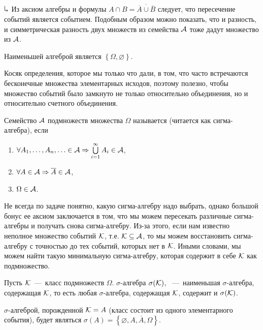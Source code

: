 \documentclass[../TV&MS.tex]{subfiles}
\begin{document}
$\h$ Из аксиом алгебры и формулы $A\cap B = \overline{\overline{A} \cup \overline {B}}$ 
следует, что пересечение событий является событием. Подобным образом можно показать, 
что и разность, и симметрическая разность двух множеств из семейства $\mathcal{A}$ тоже
дадут множество из $\mathcal{A}$.

\begin{Ex}
	Наименьшей алгеброй является $\left\{ \Omega, \varnothing \right\}$.
\end{Ex}

Косяк определения, которое мы только что дали, в том, что часто встречаются бесконечные множества элементарных исходов, поэтому полезно, чтобы множество
событий было замкнуто не только относительно объединения, но и 
относительно счетного объединения.

\begin{Def}
	Семейство $\mathcal{A}$ подмножеств множества $\Omega$ называется 
	(читается как сигма-алгебра), если 
\begin{enumerate}[label=(\roman*)]
	\item $\forall A_1,\dots,A_n,\ldots\in\mathcal{A}\Rightarrow\bigcup\limits_{i=1}^{\infty}A_i\in\mathcal{A}$,
	\item $\forall A \in \mathcal{A} \Rightarrow \overline{A} \in \mathcal{A}$,
	\item $\Omega \in \mathcal{A}$.
\end{enumerate}\smallskip
\end{Def}

Не всегда по задаче понятно, какую сигма-алгебру надо выбрать, однако большой
бонус ее аксиом заключается в том, что мы можем пересекать различные сигма-алгебры
и получать снова сигма-алгебру. Из-за этого, если нам известно неполное множество
событий $\mathcal{K}$, т.е. $\mathcal{K}\subseteq\mathcal{A}$, то мы можем восстановить сигма-алгебру
с точностью до тех событий, которых нет в $\mathcal{K}$. Иными словами, мы можем
найти такую минимальную сигма-алгебру, которая содержит в себе $\mathcal{K}$ как подмножество.

\begin{Def}
	Пусть $\mathcal{K}$~---~класс подмножеств $\Omega$. $\sigma$-алгебра $\sigma(\mathcal{K})$,
	~---~наименьшая $\sigma$-алгебра, содержащая $\mathcal{K}$, 
	то есть любая $\sigma$-алгебра, содержащая $\mathcal{K}$, содержит и $\sigma(\mathcal{K})$.
\end{Def}

\begin{Ex}
    $\sigma$-алгеброй, порожденной $\mathcal{K} = A$ (класс состоит из одного элементарного события), будет являться 
	$\sigma(A) = \left\{ \varnothing, A, \overline{A}, \Omega \right\}$.
\end{Ex}
\end{document}
